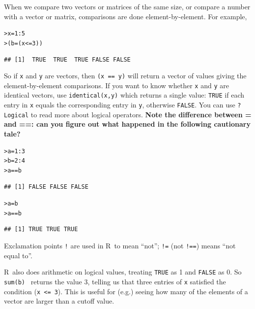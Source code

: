 \documentclass[11pt]{article}\usepackage[]{graphicx}\usepackage[]{color}
\makeatletter
\newcommand{\hlnum}[1]{\textcolor[rgb]{0.686,0.059,0.569}{#1}}%
\newcommand{\hlopt}[1]{\textcolor[rgb]{0,0,0}{#1}}%
\newcommand{\hlstd}[1]{\textcolor[rgb]{0.345,0.345,0.345}{#1}}%
\newcommand{\hlkwb}[1]{\textcolor[rgb]{0.69,0.353,0.396}{#1}}%
\newenvironment{kframe}{%
 \def\at@end@of@kframe{}%
 \ifinner\ifhmode%
  \def\at@end@of@kframe{\end{minipage}}%
  \begin{minipage}{\columnwidth}%
 \fi\fi%
 \def\FrameCommand##1{\hskip\@totalleftmargin \hskip-\fboxsep
 \colorbox{shadecolor}{##1}\hskip-\fboxsep
     \hskip-\linewidth \hskip-\@totalleftmargin \hskip\columnwidth}%
 \MakeFramed {\advance\hsize-\width
   \@totalleftmargin\z@ \linewidth\hsize
   \@setminipage}}%
 {\par\unskip\endMakeFramed%
 \at@end@of@kframe}
\newenvironment{knitrout}{}{} %
\newcommand{\code}[1]{{\tt #1}}
\newcommand\R{{\sf R}}
\numberwithin{exercise}{section}
\makeatother
\begin{document}
When we compare two vectors or matrices of the same size, or compare a 
number with a vector or matrix, comparisons are done element-by-element.  
For example,
\begin{knitrout}
\color{fgcolor}\begin{kframe}
\begin{alltt}
\hlstd{> }\hlstd{x} \hlkwb{=} \hlnum{1}\hlopt{:}\hlnum{5}
\hlstd{> }\hlstd{(b} \hlkwb{=} \hlstd{(x} \hlopt{<=} \hlnum{3}\hlstd{))}
\end{alltt}
\begin{verbatim}
## [1]  TRUE  TRUE  TRUE FALSE FALSE
\end{verbatim}
\end{kframe}
\end{knitrout}
\noindent So if \code{x} and \code{y} are vectors, then \code{(x == y)} will return a vector of 
values giving the element-by-element comparisons. If you want to know
whether \code{x} and \code{y} are identical vectors, use \code{identical(x,y)}
which returns a single value: \code{TRUE} if each entry in \code{x} equals the
corresponding entry in \code{y}, otherwise \code{FALSE}. You can use \code{?Logical} to
read more about logical operators. 
\textbf{Note the difference between = and ==: can you
figure out what happened in the following cautionary tale?}
\begin{knitrout}
\color{fgcolor}\begin{kframe}
\begin{alltt}
\hlstd{> }\hlstd{a} \hlkwb{=} \hlnum{1}\hlopt{:}\hlnum{3}
\hlstd{> }\hlstd{b} \hlkwb{=} \hlnum{2}\hlopt{:}\hlnum{4}
\hlstd{> }\hlstd{a} \hlopt{==} \hlstd{b}
\end{alltt}
\begin{verbatim}
## [1] FALSE FALSE FALSE
\end{verbatim}
\begin{alltt}
\hlstd{> }\hlstd{a} \hlkwb{=} \hlstd{b}
\hlstd{> }\hlstd{a} \hlopt{==} \hlstd{b}
\end{alltt}
\begin{verbatim}
## [1] TRUE TRUE TRUE
\end{verbatim}
\end{kframe}
\end{knitrout}
\noindent Exclamation points \verb+!+ are used in \R\ to mean ``not''; 
\verb+!=+ (not \verb+!==+) means ``not equal to''.

\R\ also does arithmetic on logical values, treating \code{TRUE} as 1 and 
\code{FALSE} as 0. So \verb! sum(b) ! returns the value 3, telling us that three 
entries of \code{x} satisfied the condition (\verb+x <= 3+). This is useful for
(e.g.) seeing how many of the elements of a vector are larger than a cutoff
value.
\end{document}
